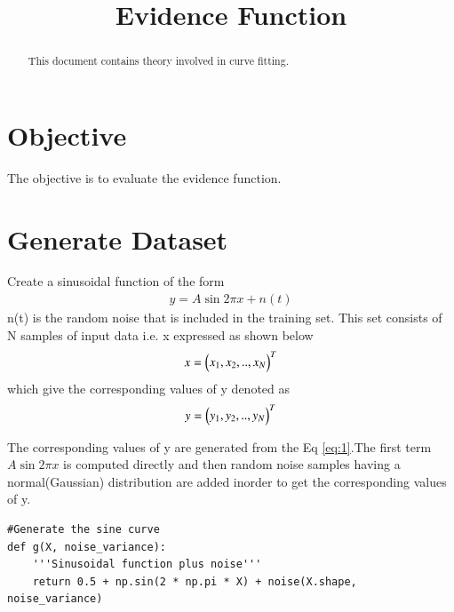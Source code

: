 \documentclass[journal,12pt,twocolumn]{IEEEtran}
\begin{document}
\makeatletter
{}
\makeatother
\let\StandardTheFigure\thefigure
\let\vec\mathbf
\renewcommand{\thefigure}{\theproblem}
\def\putbox#1#2#3{\makebox[0in][l]{\makebox[#1][l]{}\raisebox{\baselineskip}[0in][0in]{\raisebox{#2}[0in][0in]{#3}}}}
     \def\rightbox#1{\makebox[0in][r]{#1}}
     \def\centbox#1{\makebox[0in]{#1}}
     \def\topbox#1{\raisebox{-\baselineskip}[0in][0in]{#1}}
\vspace{3cm}
\title{Evidence Function}
\maketitle
\newpage
\bigskip
\renewcommand{\thefigure}{\theenumi}
\renewcommand{\thetable}{\theenumi}
\begin{abstract}
This document contains theory involved in curve fitting.
\end{abstract}
\section{\textbf{Objective}}
The objective is to evaluate the evidence function.
\section{Generate Dataset}
Create a sinusoidal function of the form
\begin{align}
    y = A\sin{2\pi x} + n(t) \label{eq:1}
\end{align}
n(t) is the random noise that is included in the training set. This set consists of N samples of input data i.e. x expressed as shown below
\begin{align}
    x = \begin{pmatrix}x_{1}, x_{2}, .., x_{N}\end{pmatrix}^{T}
\end{align}
which give the corresponding values of y denoted as
\begin{align}
    y = \begin{pmatrix}y_{1}, y_{2}, .., y_{N}\end{pmatrix}^{T}
\end{align}

The corresponding values of y are generated from the Eq \eqref{eq:1}.The first term $A\sin{2\pi x}$ is computed directly and then random noise samples having a normal(Gaussian) distribution are added inorder to get the corresponding values of y.
\begin{lstlisting}
#Generate the sine curve 
def g(X, noise_variance):
    '''Sinusoidal function plus noise'''
    return 0.5 + np.sin(2 * np.pi * X) + noise(X.shape, noise_variance)
\end{lstlisting}
\end{document}
